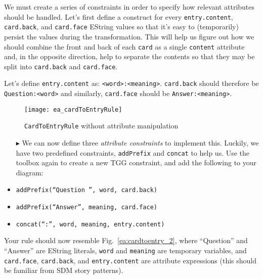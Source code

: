 We must create a series of constraints in order to specify how relevant attributes should be handled. Let's first define a construct for every
\texttt{entry\-.cont\-ent}, \texttt{card.back}, and \texttt{card.face} EString values so that it's easy to (temporarily) persist the values during the
transformation. This will help us figure out how we should combine the front and back of each \texttt{card} as a single \texttt{content} attribute and,
in the opposite direction, help to separate the contents so that they may be split into \texttt{card.back} and \texttt{card.face}.

Let's define \texttt{entry\-.cont\-ent} as: \texttt{<word>:<mean\-ing>}. \texttt{card\-.back} should therefore be \texttt{Quest\-ion:<word>} and
similarly, \texttt{card\-.face} should be \texttt{Ans\-wer:<mean\-ing>}. 

\newpage

  \begin{figure}[htbp]
  \begin{center}
    \texttt{[image: ea\_cardToEntryRule]}
    \caption{\texttt{CardToEntryRule} without attribute manipulation}
    \label{ea:cardtoentry_1}
  \end{center}
  \end{figure}


\begin{itemize}

\item[$\blacktriangleright$] We can now define three \emph{attribute constraints} to implement this. Luckily, we have two predefined constraints,
\texttt{addPrefix} and \texttt{concat} to help us. Use the toolbox again to create a new TGG constraint, and add the following to your diagram:

  \item \texttt{addPrefix(``Question '', word, card.back)}  
  
  \item \texttt{addPrefix(``Answer'', meaning, card.face)}
  
  \item \texttt{concat(``:'', word, meaning, entry.content)}

\end{itemize}

Your rule should now resemble Fig.~\ref{ea:cardtoentry_2}, where ``Question'' and ``Answer'' are EString literals, \texttt{word} and \texttt{meaning} are
temporary variables, and \texttt{card.face}, \texttt{card.back}, and \texttt{entry.content} are attribute expressions (this should be familiar from SDM story
patterns).

